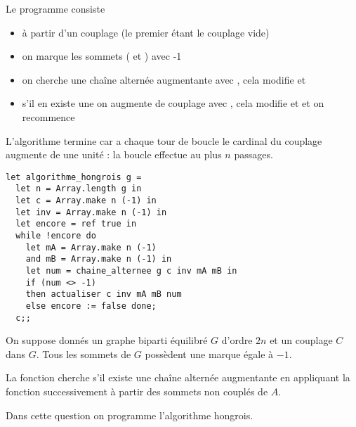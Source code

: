 \begin{Answer}
Le programme consiste  
\begin{itemize}
  \item à partir d'un couplage (le premier étant le couplage vide)
  \item on marque les sommets ( et ) avec -1
  \item on cherche une chaîne alternée augmentante avec , cela modifie  et 
  \item s'il en existe une on augmente de couplage avec , cela modifie  et  et on recommence
\end{itemize}
L'algorithme termine car a chaque tour de boucle le cardinal du couplage augmente de une unité : la boucle effectue au plus $n$ passages.
\begin{lstlisting}
let algorithme_hongrois g = 
  let n = Array.length g in
  let c = Array.make n (-1) in
  let inv = Array.make n (-1) in
  let encore = ref true in
  while !encore do
    let mA = Array.make n (-1) 
    and mB = Array.make n (-1) in
    let num = chaine_alternee g c inv mA mB in
    if (num <> -1) 
    then actualiser c inv mA mB num
    else encore := false done;
  c;;
\end{lstlisting}
\end{Answer}








\question
On suppose donnés un graphe biparti équilibré $G$ d'ordre $2n$ et un couplage $C$ dans $G$. Tous les sommets de $G$ possèdent une marque égale à $-1$.

La fonction  cherche s'il existe une chaîne alternée augmentante en appliquant la fonction  successivement à partir des sommets non couplés de $A$.


\question
Dans cette question on programme l'algorithme hongrois.




